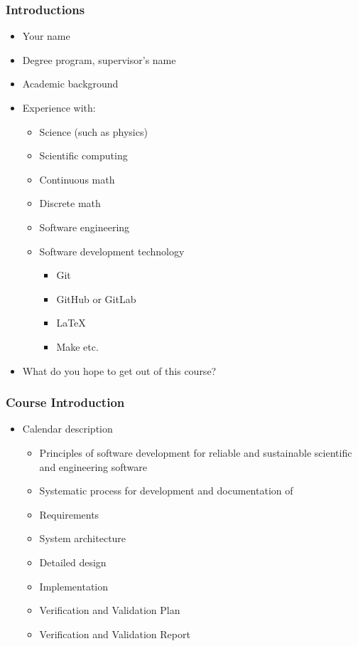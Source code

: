 \documentclass[t,12pt,numbers,fleqn]{beamer}
\begin{document}

\begin{frame}
\frametitle{Introductions}

\begin{itemize}
\item Your name
\item Degree program, supervisor's name
\item Academic background
\item Experience with:
  \begin{itemize}
  \item Science (such as physics)
  \item Scientific computing
  \item Continuous math
  \item Discrete math
  \item Software engineering
  \item Software development technology
    \begin{itemize}
    \item Git
    \item GitHub or GitLab
    \item LaTeX
    \item Make etc.
    \end{itemize}
  \end{itemize}
\item What do you hope to get out of this course?
\end{itemize}

\end{frame}


\begin{frame}
\frametitle{Course Introduction}

\begin{itemize}
\item Calendar description
\begin{itemize}
\item Principles of software development for reliable and sustainable scientific
  and engineering software
\item Systematic process for development and documentation of
\bi
\item Requirements
\item System architecture
\item Detailed design
\item Implementation
\item Verification and Validation Plan
\item Verification and Validation Report
\ei
\end{itemize}
\end{itemize}

\end{frame}
\end{document}
